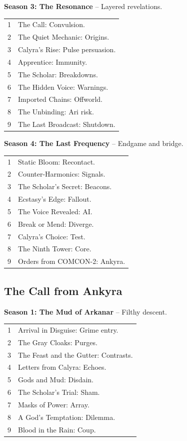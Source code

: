 \documentclass[10pt,letterpaper]{article}
\begin{document}
\textbf{Season 3: The Resonance} – Layered revelations.
\begin{longtable}{p{} p{}}
1 & The Call: Convulsion. \\
2 & The Quiet Mechanic: Origins. \\
3 & Calyra’s Rise: Pulse persuasion. \\
4 & Apprentice: Immunity. \\
5 & The Scholar: Breakdowns. \\
6 & The Hidden Voice: Warnings. \\
7 & Imported Chains: Offworld. \\
8 & The Unbinding: Ari risk. \\
9 & The Last Broadcast: Shutdown.
\end{longtable}

\textbf{Season 4: The Last Frequency} – Endgame and bridge.
\begin{longtable}{p{} p{}}
1 & Static Bloom: Recontact. \\
2 & Counter-Harmonics: Signals. \\
3 & The Scholar’s Secret: Beacons. \\
4 & Ecstasy’s Edge: Fallout. \\
5 & The Voice Revealed: AI. \\
6 & Break or Mend: Diverge. \\
7 & Calyra’s Choice: Test. \\
8 & The Ninth Tower: Core. \\
9 & Orders from COMCON-2: Ankyra.
\end{longtable}

\subsection{The Call from Ankyra}
\textbf{Season 1: The Mud of Arkanar} – Filthy descent.
\begin{longtable}{p{} p{}}
1 & Arrival in Disguise: Grime entry. \\
2 & The Gray Cloaks: Purges. \\
3 & The Feast and the Gutter: Contrasts. \\
4 & Letters from Calyra: Echoes. \\
5 & Gods and Mud: Disdain. \\
6 & The Scholar’s Trial: Sham. \\
7 & Masks of Power: Array. \\
8 & A God’s Temptation: Dilemma. \\
9 & Blood in the Rain: Coup.
\end{longtable}
\end{document}
